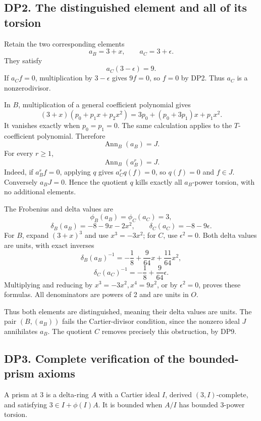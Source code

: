 \documentclass[
  10pt,
  a4paper,
]{article}
\begin{document}
\subsection{DP2. The distinguished element and all of its
torsion}\label{dp2.-the-distinguished-element-and-all-of-its-torsion}

Retain the two corresponding elements \[
a_B=3+x,\qquad a_C=3+\epsilon.
\tag{DP7}
\] They satisfy \[
a_C(3-\epsilon)=9.
\tag{DP8}
\] If \(a_C f=0\), multiplication by \(3-\epsilon\) gives \(9f=0\), so
\(f=0\) by DP2. Thus \(a_C\) is a nonzerodivisor.

In \(B\), multiplication of a general coefficient polynomial gives \[
(3+x)(p_0+p_1x+p_2x^2)
=3p_0+(p_0+3p_1)x+p_1x^2.
\] It vanishes exactly when \(p_0=p_1=0\). The same calculation applies
to the \(T\)-coefficient polynomial. Therefore \[
\operatorname{Ann}_B(a_B)=J.
\] For every \(r\ge1\), \[
\operatorname{Ann}_B(a_B^r)=J.
\tag{DP9}
\] Indeed, if \(a_B^r f=0\), applying \(q\) gives \(a_C^r q(f)=0\), so
\(q(f)=0\) and \(f\in J\). Conversely \(a_B J=0\). Hence the quotient
\(q\) kills exactly all \(a_B\)-power torsion, with no additional
elements.

The Frobenius and delta values are \[
\phi_B(a_B)=\phi_C(a_C)=3,
\] \[
\delta_B(a_B)=-8-9x-2x^2,\qquad
\delta_C(a_C)=-8-9\epsilon.
\tag{DP10}
\] For \(B\), expand \((3+x)^3\) and use \(x^3=-3x^2\); for \(C\), use
\(\epsilon^2=0\). Both delta values are units, with exact inverses \[
\delta_B(a_B)^{-1}=-\frac18+\frac9{64}x+\frac{11}{64}x^2,
\] \[
\delta_C(a_C)^{-1}=-\frac18+\frac9{64}\epsilon.
\tag{DP11}
\] Multiplying and reducing by \(x^3=-3x^2,x^4=9x^2\), or by
\(\epsilon^2=0\), proves these formulas. All denominators are powers of
2 and are units in \(O\).

Thus both elements are distinguished, meaning their delta values are
units. The pair \((B,(a_B))\) fails the Cartier-divisor condition, since
the nonzero ideal \(J\) annihilates \(a_B\). The quotient \(C\) removes
precisely this obstruction, by DP9.

\subsection{DP3. Complete verification of the bounded-prism
axioms}\label{dp3.-complete-verification-of-the-bounded-prism-axioms}

A prism at 3 is a delta-ring \(A\) with a Cartier ideal \(I\), derived
\((3,I)\)-complete, and satisfying \(3\in I+\phi(I)A\). It is bounded
when \(A/I\) has bounded \(3\)-power torsion.
\end{document}
